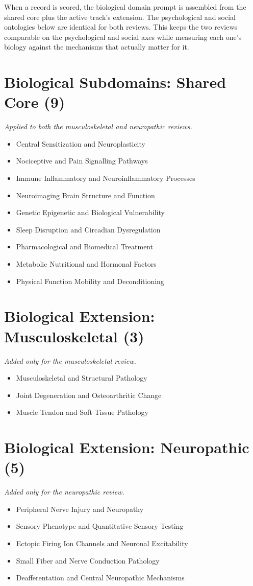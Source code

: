 \documentclass[11pt]{article}
\begin{document}
When a record is scored, the biological domain prompt is assembled from the shared core plus the active track's extension. The psychological and social ontologies below are identical for both reviews. This keeps the two reviews comparable on the psychological and social axes while measuring each one's biology against the mechanisms that actually matter for it.


\section*{Biological Subdomains: Shared Core (9)}
{\small\itshape Applied to both the musculoskeletal and neuropathic reviews.}\par\smallskip
\begin{itemize}
\item Central Sensitization and Neuroplasticity
\item Nociceptive and Pain Signalling Pathways
\item Immune Inflammatory and Neuroinflammatory Processes
\item Neuroimaging Brain Structure and Function
\item Genetic Epigenetic and Biological Vulnerability
\item Sleep Disruption and Circadian Dysregulation
\item Pharmacological and Biomedical Treatment
\item Metabolic Nutritional and Hormonal Factors
\item Physical Function Mobility and Deconditioning
\end{itemize}

\section*{Biological Extension: Musculoskeletal (3)}
{\small\itshape Added only for the musculoskeletal review.}\par\smallskip
\begin{itemize}
\item Musculoskeletal and Structural Pathology
\item Joint Degeneration and Osteoarthritic Change
\item Muscle Tendon and Soft Tissue Pathology
\end{itemize}

\section*{Biological Extension: Neuropathic (5)}
{\small\itshape Added only for the neuropathic review.}\par\smallskip
\begin{itemize}
\item Peripheral Nerve Injury and Neuropathy
\item Sensory Phenotype and Quantitative Sensory Testing
\item Ectopic Firing Ion Channels and Neuronal Excitability
\item Small Fiber and Nerve Conduction Pathology
\item Deafferentation and Central Neuropathic Mechanisms
\end{itemize}
\end{document}

